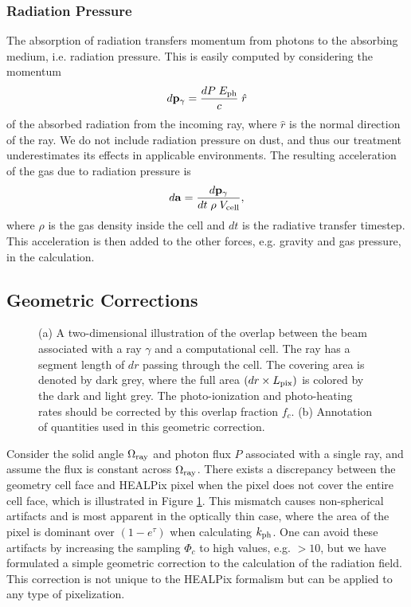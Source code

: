\documentclass[apj,onecolumn]{emulateapj}
\begin{document}
\subsubsection{Radiation Pressure}

The absorption of radiation transfers momentum from photons to the
absorbing medium, i.e. radiation pressure.  This is easily computed by
considering the momentum
\begin{equation}
  d\mathbf{p}_\gamma = \frac{dP \; E_{\rm ph}}{c} \; \hat{r}
\end{equation}
of the absorbed radiation from the incoming ray, where $\hat{r}$ is
the normal direction of the ray.  We do not include radiation pressure
on dust, and thus our treatment underestimates its effects in
applicable environments.  The resulting acceleration of the gas due to
radiation pressure is
\begin{equation}
  d\mathbf{a} = \frac{d\mathbf{p}_\gamma} {dt\; \rho \; V_{\rm cell}},
\end{equation}
where $\rho$ is the gas density inside the cell and $dt$ is the
radiative transfer timestep.  This acceleration is then added to the
other forces, e.g. gravity and gas pressure, in the calculation.

\subsection{Geometric Corrections}
\label{sec:meth_fc}

\begin{figure}[t]
  \caption{\label{fig:covering} (a) A two-dimensional illustration of
    the overlap between the beam associated with a ray $\gamma$ and a
    computational cell.  The ray has a segment length of $dr$ passing
    through the cell.  The covering area is denoted by dark grey,
    where the full area $(dr \times L_{\rm pix})$ is colored by the
    dark and light grey.  The photo-ionization and photo-heating rates
    should be corrected by this overlap fraction $f_c$.  (b)
    Annotation of quantities used in this geometric correction.}
\end{figure}

Consider the solid angle $\Omega_{\rm ray}$ and photon flux $P$
associated with a single ray, and assume the flux is constant across
$\Omega_{\rm ray}$.  There exists a discrepancy between the geometry
cell face and HEALPix pixel when the pixel does not cover the entire
cell face, which is illustrated in Figure \ref{fig:covering}.  This
mismatch causes non-spherical artifacts and is most apparent in the
optically thin case, where the area of the pixel is dominant over $(1
- e^\tau)$ when calculating $k_{\rm ph}$.  One can avoid these
artifacts by increasing the sampling $\Phi_c$ to high values,
e.g. $>10$, but we have formulated a simple geometric correction to
the calculation of the radiation field.  This correction is not unique
to the HEALPix formalism but can be applied to any type of
pixelization.
\end{document}
